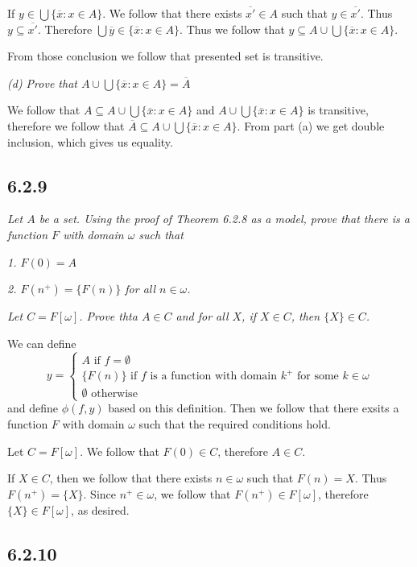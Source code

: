 \documentclass[11pt,oneside,titlepage]{book}
\begin{document}
If $y \in \bigcup{\{\overline{x}: x \in A\}}$. We follow that
there exists $\overline{x'} \in A$ such that $y \in \overline{x'}$. Thus
$y \subseteq \overline{x'}$. Therefore $\bigcup{\overline{y} \in \{\overline{x}: x \in A\}}$.
Thus we follow that $y \subseteq  A \cup \bigcup{\{\overline{x}: x \in A\}}$.

From those conclusion we follow that presented set is transitive.

\textit{(d) Prove that $A \cup \bigcup{\{\overline{x}: x \in A\}} = \overline{A}$}

We follow that $A \subseteq A \cup \bigcup{\{\overline{x}: x \in A\}}$ and
$A \cup \bigcup{\{\overline{x}: x \in A\}}$ is transitive, therefore we follow that
$\overline{A} \subseteq A \cup \bigcup{\{\overline{x}: x \in A\}}$. From part
(a) we get double inclusion, which gives us equality.

\subsection*{6.2.9}

\textit{Let $A$ be a set. Using the proof of Theorem 6.2.8 as a model, prove that
  there is a function $F$ with domain $\omega$ such that}

\textit{1. $F(0) = A$}

\textit{2. $F(n^+) = \{F(n)\}$ for all $n \in \omega$.}

\textit{Let $C = F[\omega]$. Prove thta $A \in C$ and for all $X$, if $X \in C$,
  then $\{X\} \in C$.}

We can define
$$y =
\begin{cases}
  A \text{ if } f = \emptyset \\
  \{F(n)\} \text{ if $f$ is a function with domain $k^+$ for some $k \in \omega$} \\
  \emptyset \text{ otherwise}
\end{cases}
$$
and define $\phi(f, y)$ based on this definition. Then we follow that there exsits
a function $F$ with domain $\omega$ such that the required conditions hold.

Let $C = F[\omega]$. We follow that $F(0) \in C$, therefore $A \in C$.

If $X \in C$, then we follow that there exists $n \in \omega$ such that
$F(n) = X$. Thus $F(n^+) = \{X\}$. Since $n^+ \in \omega$, we follow that
$F(n^+) \in F[\omega]$, therefore $\{X\} \in F[\omega]$, as desired.

\subsection*{6.2.10}
\end{document}
